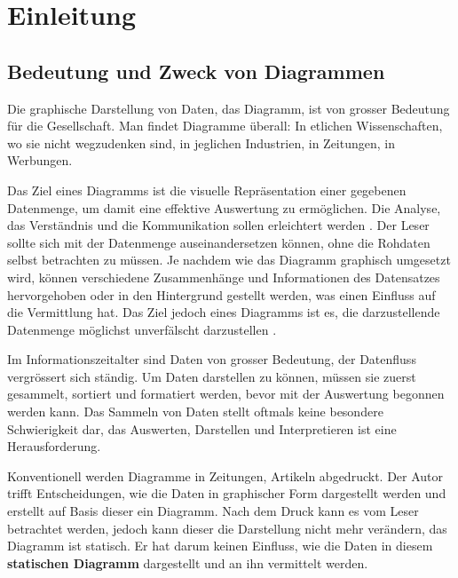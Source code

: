 \chapter{Einleitung}

\section{Bedeutung  und Zweck von Diagrammen}

Die graphische Darstellung von Daten, das Diagramm, ist von grosser Bedeutung für die Gesellschaft. Man findet Diagramme überall: In etlichen Wissenschaften, wo sie nicht wegzudenken sind, in jeglichen Industrien, in Zeitungen, in Werbungen.


Das Ziel eines Diagramms ist die visuelle Repräsentation einer gegebenen Datenmenge, um damit eine effektive Auswertung zu ermöglichen. Die Analyse, das Verständnis und die Kommunikation sollen erleichtert werden \cite{viz}. Der Leser sollte sich mit der Datenmenge auseinandersetzen können, ohne die Rohdaten selbst betrachten zu müssen. Je nachdem wie das Diagramm graphisch umgesetzt wird, können verschiedene Zusammenhänge und Informationen des Datensatzes hervorgehoben oder in den Hintergrund gestellt werden, was einen Einfluss auf die Vermittlung hat. 
Das Ziel jedoch eines Diagramms ist es, die darzustellende Datenmenge möglichst unverfälscht darzustellen \cite{viz}. 


Im Informationszeitalter sind Daten von grosser Bedeutung, der Datenfluss vergrössert sich ständig. Um Daten darstellen zu können, müssen sie zuerst gesammelt, sortiert und formatiert werden, bevor mit der Auswertung begonnen werden kann. Das Sammeln von Daten stellt oftmals keine besondere Schwierigkeit dar, das Auswerten, Darstellen und Interpretieren ist eine Herausforderung.

Konventionell werden Diagramme in Zeitungen, Artikeln abgedruckt. Der Autor trifft Entscheidungen, wie die Daten in graphischer Form dargestellt werden und erstellt auf Basis dieser ein Diagramm. Nach dem Druck kann es vom Leser betrachtet werden, jedoch kann dieser die Darstellung nicht mehr verändern, das Diagramm ist statisch. Er hat darum keinen Einfluss, wie die Daten in diesem \textbf{statischen Diagramm} dargestellt und an ihn vermittelt werden.

